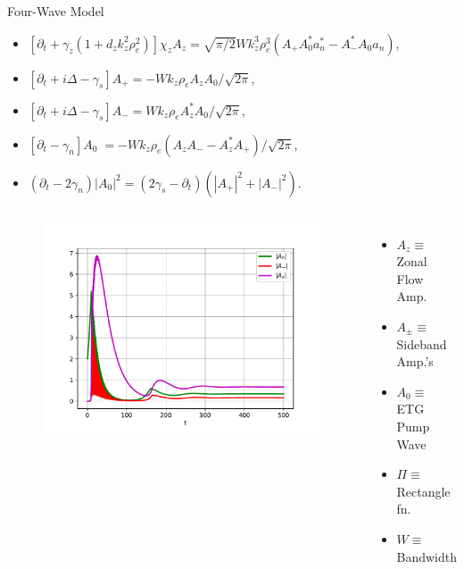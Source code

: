 \documentclass[aspectratio=43]{beamer}
\begin{document}
   \begin{frame}{Four-Wave Model}
      \begin{itemize}
         \item $[\partial_{t}+\gamma_{z}(1+d_{z}k_{z}^{2}\rho_{e}^{2})]\chi_{z}A_{z}\nonumber =
                \sqrt{\pi/2} W k_{z}^{3}\rho_{e}^{3}(A_{+}A^{*}_{0}a_{n}^{*}-A^{*}_{-}A_{0}a_{n})$,
         \item$[\partial_{t}+ i\Delta-\gamma_{s}]A_{+}=-W k_{z}\rho_{e}A_{z}A_{0}/\sqrt{2\pi}$,
         \item$[\partial_{t}+ i\Delta-\gamma_{s}]A_{-}=W k_{z}\rho_{e}A^{*}_{z}A_{0}/\sqrt{2\pi}$,
         \item\quad\quad\;$[\partial_{t}-\gamma_{n}]A_{0}\;=-W k_{z}\rho_{e}( A_{z}A_{-}-A^{*}_{z}A_{+})/\sqrt{2\pi}$,
         \item\quad$(\partial_{t}-2\gamma_{n})|A_{0}|^{2}\!=(2\gamma_{s}-\partial_{t})(|A_{+}|^{2}+|A_{-}|^{2})$.
      \end{itemize}
      \begin{columns}
         \begin{figure}
            \vspace*{-.6cm}\includegraphics[scale=.4]{Images/FourWavePlot.pdf}
         \end{figure}
         \vspace{-.6cm}
         \begin{itemize}
            \item $A_z\equiv$ Zonal Flow Amp.
            \item $A_{\pm}\equiv$ Sideband Amp.'s
            \item $A_0\equiv$ ETG Pump Wave
            \item $\Pi\equiv$ Rectangle fn.
            \item $W\equiv$ Bandwidth
         \end{itemize}
      \end{columns}
   \end{frame}
\end{document}
